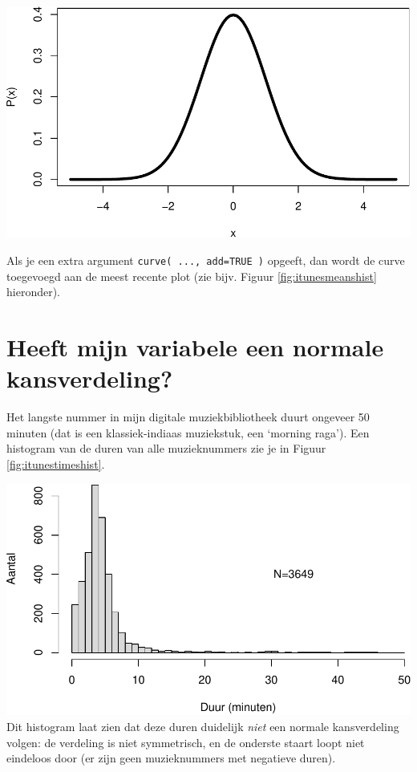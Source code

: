 \documentclass[
]{book}
\begin{document}
\includegraphics{KMS-NL_files/figure-latex/normkansverdeling.dnorm-1.pdf}

Als je een extra argument \texttt{curve(\ ...,\ add=TRUE\ )} opgeeft, dan wordt de curve toegevoegd aan de meest recente plot (zie bijv. Figuur \ref{fig:itunesmeanshist} hieronder).

\hypertarget{sec:isvarnormaalverdeeld}{%
\section{Heeft mijn variabele een normale kansverdeling?}\label{sec:isvarnormaalverdeeld}}

Het langste nummer in mijn digitale muziekbibliotheek duurt ongeveer 50
minuten (dat is een klassiek-indiaas muziekstuk, een `morning raga').
Een histogram van de duren van alle muzieknummers zie je in
Figuur \ref{fig:itunestimeshist}.

\includegraphics{KMS-NL_files/figure-latex/itunestimeshist-1.pdf}
Dit histogram laat zien dat deze duren
duidelijk \emph{niet} een normale kansverdeling volgen: de verdeling is niet
symmetrisch, en de onderste staart loopt niet eindeloos door (er zijn
geen muzieknummers met negatieve duren).
\end{document}
